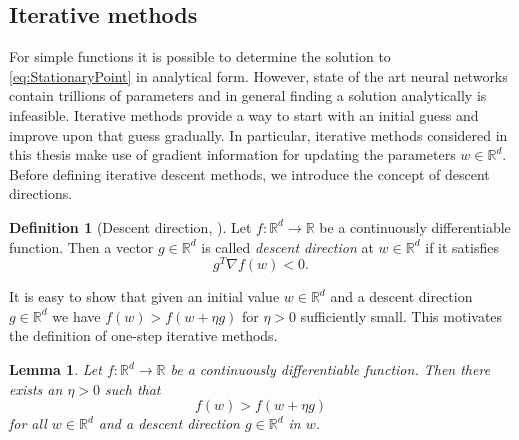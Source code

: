 \documentclass[12pt]{article}
\newtheorem{lemma}[lemma]{Lemma}
\theoremstyle{definition}
\newtheorem{definition}[definition]{Definition}
\numberwithin{equation}{section}
\newcommand{\R}{\mathbb{R}}
\begin{document}
\subsection{Iterative methods}
For simple functions it is possible to determine the solution to \eqref{eq:StationaryPoint} in analytical form. However, state of the art neural networks contain trillions of parameters and in general finding a solution analytically is infeasible. Iterative methods provide a way to start with an initial guess and improve upon that guess gradually. In particular, iterative methods considered in this thesis make use of gradient information for updating the parameters $w \in \mathbb{R}^d$. Before defining iterative descent methods, we introduce the concept of descent directions. 
\begin{definition}[Descent direction, ]
  Let $f: \mathbb{R}^d \rightarrow \mathbb{R}$ be a continuously differentiable function. Then a vector $g \in \mathbb{R}^d$ is called \emph{descent direction} at $w \in \mathbb{R}^d$ if it satisfies 
  \begin{equation}
    g^T \nabla f(w) < 0.
  \end{equation} 
\end{definition}
It is easy to show that given an initial value $w \in \mathbb{R}^d$ and a descent direction $g \in \mathbb{R}^d$ we have $f(w) > f(w + \eta g)$ for $\eta > 0$ sufficiently small. This motivates the definition of one-step iterative methods.
\begin{lemma}
  Let $f : \R^d \rightarrow \R$ be a continuously differentiable function. Then there exists an $\eta > 0$ such that
  \begin{equation}
    f(w) > f(w + \eta g)
  \end{equation}
  for all $w \in \R^d$ and a descent direction $g \in \R^d$ in $w$.
\end{lemma}
\end{document}
